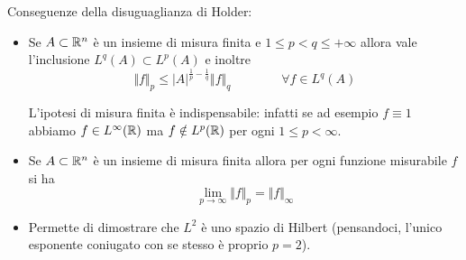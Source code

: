 Conseguenze della disuguaglianza di Holder:
\begin{itemize}
    \item Se $A\subset\mathbb{R}^n$ è un insieme di misura finita e $1\leq p<q\leq+\infty$ allora vale l'inclusione $L^q(A)\subset L^p(A)$ e inoltre
    $$
    \Vert f \Vert_p\leq |A|^{\frac{1}{p}-\frac{1}{q}}\Vert f\Vert_q \qquad \qquad \forall f\in L^q(A) 
    $$
    \begin{rem}
    L'ipotesi di misura finita è indispensabile: infatti se ad esempio $f\equiv 1$ abbiamo $f\in L^\infty(\mathbb{R})$ ma $f\notin L^p(\mathbb{R})$ per ogni $1\leq p<\infty$.
    \end{rem}

    \item Se $A\subset\mathbb{R}^n$ è un insieme di misura finita allora per ogni funzione misurabile $f$ si ha
    $$
    \lim_{p\to\infty}\Vert f\Vert_p=\Vert f\Vert_{\infty}
    $$

    \item Permette di dimostrare che $L^2$ è uno spazio di Hilbert (pensandoci, l'unico esponente coniugato con se stesso è proprio $p=2$).
\end{itemize}

